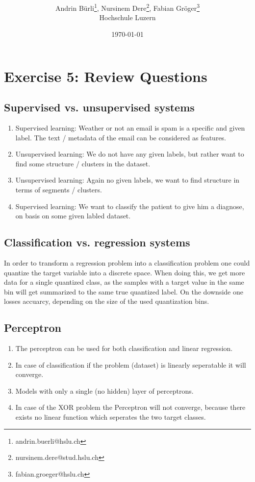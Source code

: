 \documentclass[onecolumn]{article}
\title{\spacecaps{Lab report: SW01 }\\ \normalsize \spacesc{TSM\_DeLearn} }
\author{Andrin Bürli\thanks{andrin.buerli@hslu.ch}, Nursinem Dere\thanks{nursinem.dere@stud.hslu.ch}, Fabian Gröger\thanks{fabian.groeger@hslu.ch}\\Hochschule Luzern}
\date{\today}
\begin{document}
\maketitle


\section{Exercise 5: Review Questions}
\subsection{Supervised vs. unsupervised systems}

\begin{enumerate}[label=(\alph*)]
	\item Supervised learning: Weather or not an email is spam is a specific and given label. The text / metadata of the email can be considered as features.
	\item Unsupervised learning: We do not have any given labels, but rather want to find some structure / clusters in the dataset.
	\item Unsupervised learning: Again no given labels, we want to find structure in terms of segments / clusters.
	\item Supervised learning: We want to classify the patient to give him a diagnose, on basis on some given labled dataset.
\end{enumerate}

\subsection{Classification vs. regression systems}
In order to transform a regression problem into a classification problem one could quantize the target variable into a discrete space. When doing this, we get more data for a single quantized class, as the samples with a target value in the same bin will get summarized to the same true quantized label. On the downside one losses accuarcy, depending on the size of the used quantization bins.


\subsection{Perceptron}
\begin{enumerate}[label=(\alph*)]
\item  The perceptron can be used for both classification and linear regression.
\item In case of classification if the problem (dataset) is linearly seperatable it will converge.
\item Models with only a single (no hidden) layer of perceptrons.
\item In case of the XOR problem the Perceptron will not converge, because there exists no linear function which seperates the two target classes.

\end{enumerate}
\end{document}
